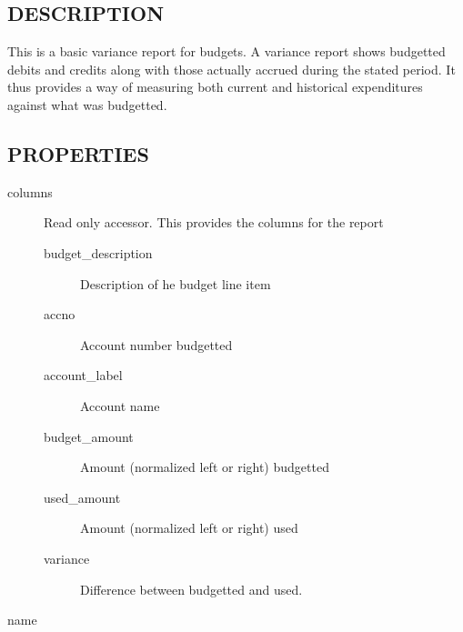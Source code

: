 \begin{description}
\begin{description}
\begin{description}
\begin{description}
\begin{description}
\begin{description}
\begin{description}
\begin{description}
\begin{description}
\begin{description}
\subsection*{DESCRIPTION\label{LedgerSMB::DBObject::Report::Budget::Variance_DESCRIPTION}}


This is a basic variance report for budgets.  A variance report shows budgetted
debits and credits along with those actually accrued during the stated period.
It thus provides a way of measuring both current and historical expenditures
against what was budgetted.

\subsection*{PROPERTIES\label{LedgerSMB::DBObject::Report::Budget::Variance_PROPERTIES}}
\begin{description}

\item[{columns}] \mbox{}

Read only accessor.  This provides the columns for the report

\begin{description}

\item[{budget\_description}] \mbox{}

Description of he budget line item


\item[{accno}] \mbox{}

Account number budgetted


\item[{account\_label}] \mbox{}

Account name


\item[{budget\_amount}] \mbox{}

Amount (normalized left or right) budgetted


\item[{used\_amount}] \mbox{}

Amount (normalized left or right) used


\item[{variance}] \mbox{}

Difference between budgetted and used.

\end{description}

\item[{name}] \mbox{}


\end{description}
\end{description}
\end{description}
\end{description}
\end{description}
\end{description}
\end{description}
\end{description}
\end{description}
\end{description}
\end{description}
